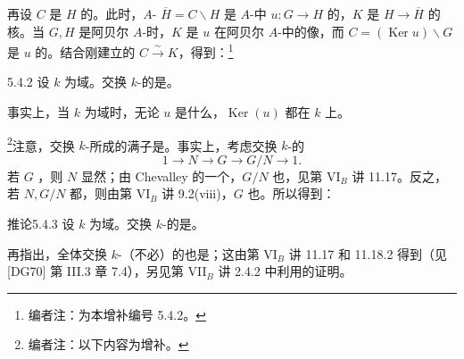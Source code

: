 再设 $C$ 是 $H$ 的。此时，$A$- $\overline H=C\backslash H$ 是 $A$-中 $u:G\to H$ 的，$K$ 是 $H\to\overline H$ 的核。当 $G,H$ 是阿贝尔 $A$-时，$K$ 是 $u$ 在阿贝尔 $A$-中的像，而 $C=(\operatorname{Ker}u)\backslash G$ 是 $u$ 的。结合刚建立的 $C\xrightarrow{\sim}K$，得到：\footnote[53]{编者注：为本增补编号 5.4.2。}
\begin{SGAresult}{}{5.4.2}
设 $k$ 为域。交换 $k$-的是。
\end{SGAresult}
事实上，当 $k$ 为域时，无论 $u$ 是什么，$\operatorname{Ker}(u)$ 都在 $k$ 上。

\footnote{编者注：以下内容为增补。}注意，交换 $k$-所成的满子是。事实上，考虑交换 $k$-的
\[
1\longrightarrow N\longrightarrow G\longrightarrow G/N\longrightarrow1.
\]
若 $G$ ，则 $N$ 显然；由 Chevalley 的一个，$G/N$ 也，见第 VI$_B$ 讲 11.17。反之，若 $N,G/N$ 都，则由第 VI$_B$ 讲 9.2(viii)，$G$ 也。所以得到：
\begin{SGAresult}{推论}{5.4.3}
设 $k$ 为域。交换 $k$-的是。
\end{SGAresult}
再指出，全体交换 $k$-（不必）的也是；这由第 VI$_B$ 讲 11.17 和 11.18.2 得到（见 [DG70] 第 III.3 章 7.4），另见第 VII$_B$ 讲 2.4.2 中利用的证明。

